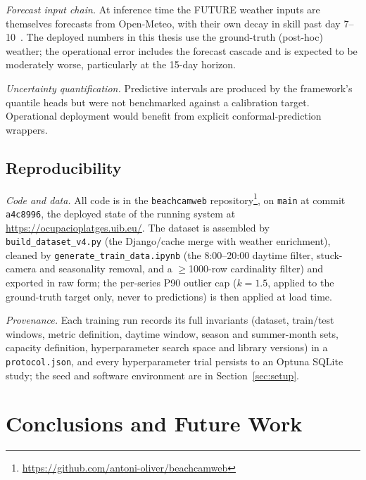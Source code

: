 \documentclass[twocolumn,twoside,a4paper,10pt]{IEEEtran}
\begin{document}
\textit{Forecast input chain.} At inference time the FUTURE weather inputs are themselves forecasts from Open-Meteo, with their own decay in skill past day 7--10~\cite{ECMWF2024}. The deployed numbers in this thesis use the ground-truth (post-hoc) weather; the operational error includes the forecast cascade and is expected to be moderately worse, particularly at the 15-day horizon.

\textit{Uncertainty quantification.} Predictive intervals are produced by the framework's quantile heads but were not benchmarked against a calibration target. Operational deployment would benefit from explicit conformal-prediction wrappers.



\subsection{Reproducibility}\label{sec:repro}

\textit{Code and data.} All code is in the \texttt{beachcamweb} repository\footnote{\url{https://github.com/antoni-oliver/beachcamweb}}, on \texttt{main} at commit \texttt{a4c8996}, the deployed state of the running system at \url{https://ocupacioplatges.uib.eu/}.
The dataset is assembled by \texttt{build\_dataset\_v4.py} (the Django/cache merge with weather enrichment), cleaned by \texttt{generate\_train\_data.ipynb} (the 8:00--20:00 daytime filter, stuck-camera and seasonality removal, and a $\geq$1000-row cardinality filter) and exported in raw form; the per-series P90 outlier cap ($k=1.5$, applied to the ground-truth target only, never to predictions) is then applied at load time.

\textit{Provenance.} Each training run records its full invariants (dataset, train/test windows, metric definition, daytime window, season and summer-month sets, capacity definition, hyperparameter search space and library versions) in a \texttt{protocol.json}, and every hyperparameter trial persists to an Optuna SQLite study; the seed and software environment are in Section~\ref{sec:setup}.

\section{Conclusions and Future Work}\label{sec:conclusion}
\end{document}
